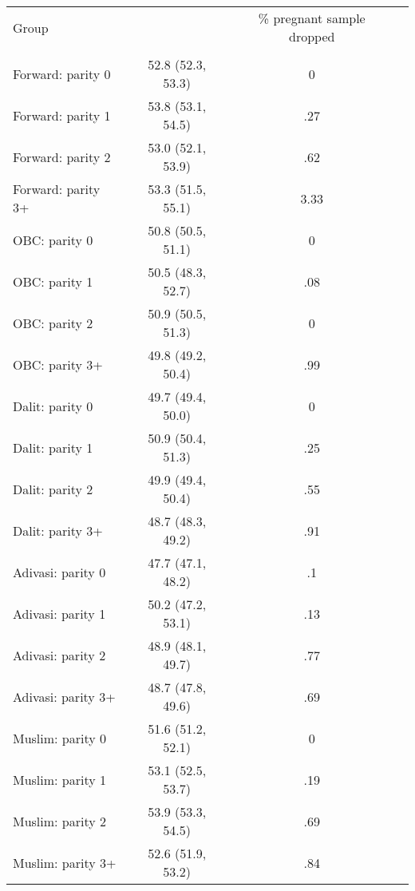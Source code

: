 \begin{tabular}{lccc}
\toprule
Group &  & \% pregnant sample dropped \\\\
\midrule
Forward: parity 0&52.8 (52.3, 53.3)&0\\
Forward: parity 1&53.8 (53.1, 54.5)&.27\\
Forward: parity 2&53.0 (52.1, 53.9)&.62\\
Forward: parity 3+&53.3 (51.5, 55.1)&3.33\\
OBC: parity 0&50.8 (50.5, 51.1)&0\\
OBC: parity 1&50.5 (48.3, 52.7)&.08\\
OBC: parity 2&50.9 (50.5, 51.3)&0\\
OBC: parity 3+&49.8 (49.2, 50.4)&.99\\
Dalit: parity 0&49.7 (49.4, 50.0)&0\\
Dalit: parity 1&50.9 (50.4, 51.3)&.25\\
Dalit: parity 2&49.9 (49.4, 50.4)&.55\\
Dalit: parity 3+&48.7 (48.3, 49.2)&.91\\
Adivasi: parity 0&47.7 (47.1, 48.2)&.1\\
Adivasi: parity 1&50.2 (47.2, 53.1)&.13\\
Adivasi: parity 2&48.9 (48.1, 49.7)&.77\\
Adivasi: parity 3+&48.7 (47.8, 49.6)&.69\\
Muslim: parity 0&51.6 (51.2, 52.1)&0\\
Muslim: parity 1&53.1 (52.5, 53.7)&.19\\
Muslim: parity 2&53.9 (53.3, 54.5)&.69\\
Muslim: parity 3+&52.6 (51.9, 53.2)&.84\\
\bottomrule
\end{tabular}
